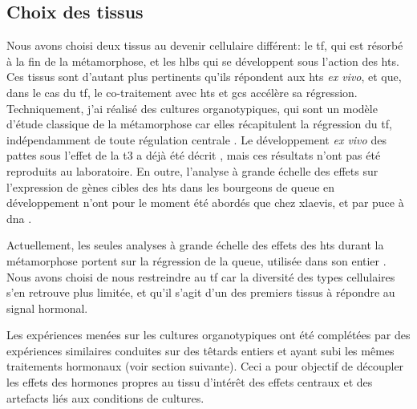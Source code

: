 \documentclass[../main.tex]{subfiles}
\begin{document}
	\subsection{Choix des tissus}
		Nous avons choisi deux tissus au devenir cellulaire différent: le \gls{tf}, qui est résorbé à la fin de la métamorphose, et les \glspl{hlb} qui se développent sous l'action des \glspl{ht}.
		Ces tissus sont d'autant plus pertinents qu'ils répondent aux \glspl{ht} \textit{ex vivo}, et que, dans le cas du \gls{tf}, le co-traitement avec \glspl{ht} et \glspl{gc} accélère sa régression.
		Techniquement, j'ai réalisé des cultures organotypiques, qui sont un modèle d'étude classique de la métamorphose car elles récapitulent la régression du \gls{tf}, indépendamment de toute régulation centrale \citep{Kikuyama1982,Kikuyama1983,Galton1990}.
		Le développement \textit{ex vivo} des pattes sous l'effet de la \gls{t3} a déjà été décrit \citep{Tata1991}, mais ces résultats n'ont pas été reproduits au laboratoire.
		En outre, l'analyse à grande échelle des effets sur l'expression de gènes cibles des \glspl{ht} dans les bourgeons de queue en développement n'ont pour le moment été abordés que chez \gls{xlaevis}, et par puce à \gls{dna} \citep{Buckbinder1992}.
		\par
		Actuellement, les seules analyses à grande échelle des effets des \glspl{ht} durant la métamorphose portent sur la régression de la queue, utilisée dans son entier \citep{Wang1993,Helbing2003,Kulkarni2012}.
		Nous avons choisi de nous restreindre au \gls{tf} car la diversité des types cellulaires s'en retrouve plus limitée, et qu'il s'agit d'un des premiers tissus à répondre au signal hormonal.
		\par
		Les expériences menées sur les cultures organotypiques ont été complétées par des expériences similaires conduites sur des têtards entiers et ayant subi les mêmes traitements hormonaux (voir section suivante).
		Ceci a pour objectif de découpler les effets des hormones propres au tissu d'intérêt des effets centraux et des artefacts liés aux conditions de cultures.
\end{document}

